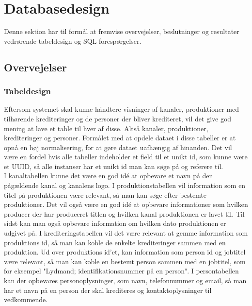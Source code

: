 \section{Databasedesign}
Denne sektion har til formål at fremvise overvejelser, beslutninger og resultater vedrørende tabeldesign og SQL-forespørgelser.

\subsection{Overvejelser}
\subsubsection{Tabeldesign}
Eftersom systemet skal kunne håndtere visninger af kanaler, produktioner med tilhørende krediteringer og de personer der bliver krediteret, vil det give god mening at lave et table til hver af disse. Altså kanaler, produktioner, krediteringer og personer. Formålet med at opdele dataet i disse tabeller er at opnå en høj normalisering, for at gøre dataet uafhængig af hinanden. Det vil være en fordel hvis alle tabeller indeholder et field til et unikt id, som kunne være et UUID, så alle instanser har et unikt id man kan søge på og referere til. \\


I kanaltabellen kunne det være en god idé at opbevare et navn på den pågældende kanal og kanalens logo. I produktionstabellen vil information som en titel på produktionen være relevant, så man kan søge efter bestemte produktioner. Det vil også være en god idé at opbevare informationer som hvilken producer der har produceret titlen og hvilken kanal produktionen er lavet til. Til sidst kan man også opbevare information om hvilken dato produktionen er udgivet på. I krediteringstabellen vil det være relevant at gemme information som produktions id, så man kan koble de enkelte krediteringer sammen med en produktion. Ud over produktions id'et, kan information som person id og jobtitel være relevant, så man kan koble en bestemt person sammen med en jobtitel, som for eksempel "Lydmand; identifikationsnummer på en person". I persontabellen kan der opbevares personoplysninger, som navn, telefonnummer og email, så man har et navn på en person der skal krediteres og kontaktoplysninger til vedkommende. \\


